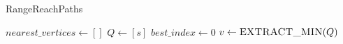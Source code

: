 {%
		





\begin{algorithm}[t]
\caption{RangeReachPaths}
\begin{scriptsize}
\label{alg3}
\begin{algorithmic}[1]
	\State $nearest\_vertices \gets []$
	\State $Q \gets [s]$
	\State $best\_index \gets 0$
	  \label{alg:theqstart}
		\State $v \gets \Call{EXTRACT\_MIN}{Q}$
		

\end{algorithmic}
\end{scriptsize}
\end{algorithm}}
